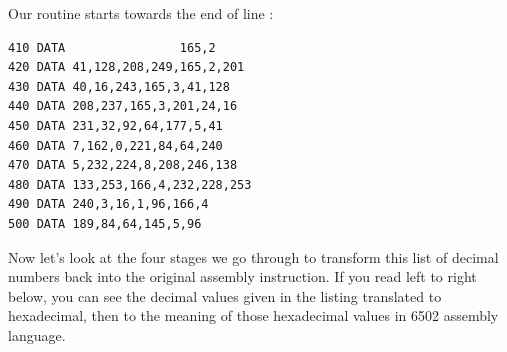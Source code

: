 Our  routine starts towards the end of line :
\begin{lstlisting}
410 DATA                165,2
420 DATA 41,128,208,249,165,2,201
430 DATA 40,16,243,165,3,41,128
440 DATA 208,237,165,3,201,24,16
450 DATA 231,32,92,64,177,5,41
460 DATA 7,162,0,221,84,64,240
470 DATA 5,232,224,8,208,246,138
480 DATA 133,253,166,4,232,228,253
490 DATA 240,3,16,1,96,166,4
500 DATA 189,84,64,145,5,96   
\end{lstlisting}

Now let's look at the four stages we go through to transform this list of decimal numbers back into the original
assembly instruction. If you read left to right below, you can see the decimal values given in the listing translated to
hexadecimal, then to the meaning of those hexadecimal values in 6502 assembly language.


